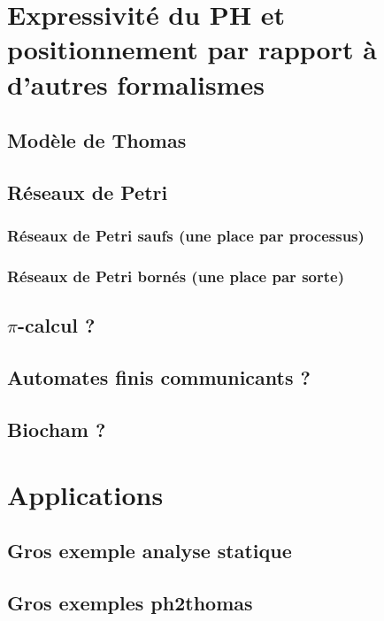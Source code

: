 \documentclass[12pt,french]{these-LUNAM}  %
\theoremstyle{definition}
\theoremstyle{remark}
\begin{document}


\chapter{Expressivité du PH et positionnement par rapport à d'autres formalismes}
  \section{Modèle de Thomas}
  \section{Réseaux de Petri}
    \subsection{Réseaux de Petri saufs (une place par processus)}
    \subsection{Réseaux de Petri bornés (une place par sorte)}
  \section{$\pi$-calcul ?}
  \section{Automates finis communicants ?}
  \section{Biocham ?}

\chapter{Applications}
  \section{Gros exemple analyse statique}
  \section{Gros exemples ph2thomas}


  
%

\end{document}
